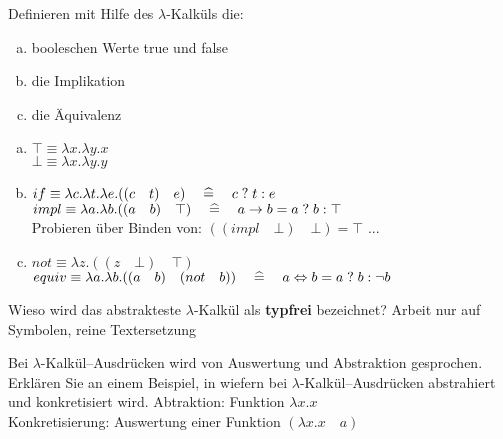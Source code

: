 \begin{card}
	Definieren mit Hilfe des $\lambda$-Kalküls die:
	\begin{enumerate}[a)]
    \item booleschen Werte true und false
    \item die Implikation
    \item die Äquivalenz
	\end{enumerate}
	\hr
	\begin{enumerate}[a)]
    \item $\top \equiv \lambda x.\lambda y . x$\\
        $\bot \equiv \lambda x.\lambda y . y$
    \item $if \equiv \lambda c.\lambda t.\lambda e.((c \quad t) \quad e) \quad \mathrel{\widehat{=}} \quad c \; ? \; t : e$ \\
        $impl \equiv \lambda a.\lambda b.((a \quad b) \quad \top) \quad \mathrel{\widehat{=}} \quad a \rightarrow b = a \; ? \; b : \top$ \\
        Probieren über Binden von: $((impl \quad \bot) \quad \bot) = \top$ ...
    \item	$not \equiv \lambda z.((z \quad \bot) \quad \top)$\\
        $equiv \equiv  \lambda a.\lambda b.((a \quad b) \quad (not \quad b)) \quad \mathrel{\widehat{=}} \quad a \Leftrightarrow b = a \; ? \; b : \neg b$
	\end{enumerate}
\end{card}

\begin{card}
	Wieso wird das abstrakteste $\lambda$-Kalkül als \textbf{typfrei} bezeichnet?
	\hr
	Arbeit nur auf Symbolen, reine Textersetzung
\end{card}

\begin{card}
  Bei $\lambda$-Kalkül--Ausdrücken wird von Auswertung und Abstraktion gesprochen. Erklären Sie an einem Beispiel, in wiefern bei $\lambda$-Kalkül--Ausdrücken abstrahiert und konkretisiert wird.
  \hr
  Abtraktion: Funktion $\lambda x.x$\\
  Konkretisierung: Auswertung einer Funktion $(\lambda x.x \quad a)$
\end{card}

